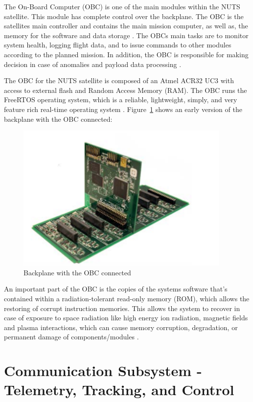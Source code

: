 \documentclass[12pt, a4paper]{report}
\begin{document}
The On-Board Computer (OBC) is one of the main modules within the NUTS satellite. This module has complete control over the backplane. The OBC is the satellites main controller and contains the main mission computer, as well as, the memory for the software and data storage \cite{overview}\cite{power_distribution}. The OBCs main tasks are to monitor system health, logging flight data, and to issue commands to other modules according to the planned mission. In addition, the OBC is responsible for making decision in case of anomalies and payload data processing \cite{overview}.

The OBC for the NUTS satellite is composed of an Atmel ACR32 UC3 with access to external flash and Random Access Memory (RAM). The OBC runs the FreeRTOS operating system, which is a reliable, lightweight, simply, and very feature rich real-time operating system \cite{freertos}. Figure~\ref{fig:obc} shows an early version of the backplane with the OBC connected:

\begin{figure}[H]
    \centering
    \includegraphics[width=300pt]{images/nuts_obc.PNG}
    \caption{Backplane with the OBC connected \cite{overview}}
    \label{fig:obc}
\end{figure}

An important part of the OBC is the copies of the systems software that's contained within a radiation-tolerant read-only memory (ROM), which allows the restoring of corrupt instruction memories. This allows the system to recover in case of exposure to space radiation like high energy ion radiation, magnetic fields and plasma interactions, which can cause memory corruption, degradation, or permanent damage of components/modules \cite{radiation}.

\section{Communication Subsystem - Telemetry, Tracking, and Control}
\end{document}
